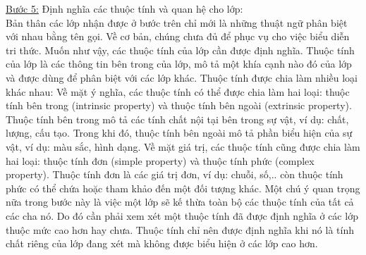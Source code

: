 \underline{Bước 5:} Định nghĩa các thuộc tính và quan hệ cho lớp: \\
Bản thân các lớp nhận được ở bước trên chỉ mới là những thuật ngữ phân biệt với nhau bằng tên gọi. Về cơ bản, chúng chưa đủ để phục vụ cho việc biểu diễn tri thức. Muốn như vậy, các thuộc tính của lớp cần được định nghĩa. Thuộc tính của lớp là các thông tin bên trong của lớp, mô tả một khía cạnh nào đó của lớp và được dùng để phân biệt với các lớp khác. Thuộc tính được chia làm nhiều loại khác nhau:
Về mặt ý nghĩa, các thuộc tính có thể được chia làm hai loại: thuộc tính bên trong
(intrinsic property) và thuộc tính bên ngoài (extrinsic property). Thuộc tính bên trong mô tả các tính chất nội tại bên trong sự vật, ví dụ: chất, lượng, cấu tạo. Trong khi đó, thuộc tính bên ngoài mô tả phần biểu hiện của sự vật, ví dụ: màu sắc, hình dạng. Về mặt giá trị, các thuộc tính cũng được chia làm hai loại: thuộc tính đơn (simple property) và thuộc tính phức (complex property). Thuộc tính đơn là các giá trị đơn, ví dụ: chuỗi, số,.. còn thuộc tính phức có thể chứa hoặc tham khảo đến một đối tượng khác. Một chú ý quan trọng nữa trong bước này là việc một lớp sẽ kế thừa toàn bộ các thuộc tính của tất cả các cha nó. Do đó cần phải xem xét một thuộc tính đã được định nghĩa ở các lớp thuộc mức cao hơn hay chưa. Thuộc tính chỉ nên được định nghĩa khi nó là tính chất riêng của lớp đang xét mà không được biểu hiện ở các lớp cao hơn. 

